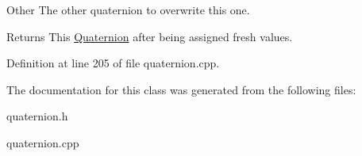 Other The other quaternion to overwrite this one. \begin{DoxyReturn}{Returns}
This \hyperlink{classphys_1_1Quaternion}{Quaternion} after being assigned fresh values. 
\end{DoxyReturn}


Definition at line 205 of file quaternion.cpp.



The documentation for this class was generated from the following files:\begin{DoxyCompactItemize}
\item 
quaternion.h\item 
quaternion.cpp\end{DoxyCompactItemize}
